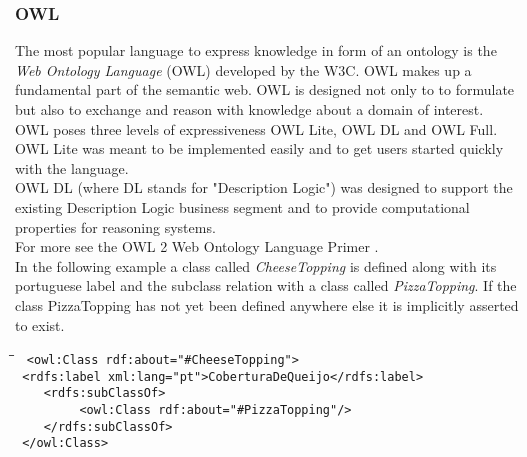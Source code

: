 \subsubsection{OWL}
The most popular language to express knowledge in form of an ontology is
the \emph{Web Ontology Language} (OWL) developed by the W3C.
OWL makes up a fundamental part of the semantic web.
OWL is designed not only to to formulate but also to exchange and reason
with knowledge about a domain of interest.\\
OWL poses three levels of expressiveness OWL Lite, OWL DL and OWL Full.
OWL Lite was meant to be implemented easily and to get users started quickly
with the language.\\
OWL DL (where DL stands for "Description Logic") was designed to support
the existing Description Logic business segment and to provide computational
properties for reasoning systems.\\
For more see the OWL 2 Web Ontology Language Primer \cite{OWL2Primer}.\\
\vspace{1cm}
In the following example a class called \emph{CheeseTopping} is defined
along with its portuguese label and the subclass relation with a class
called \emph{PizzaTopping}.
If the class PizzaTopping has not yet been defined anywhere else it is
implicitly asserted to exist.
\begin{tabbing}
\hspace*{1cm}\=\hspace{1cm}\=\hspace{1cm}\=\kill
\verb$ <owl:Class rdf:about="#CheeseTopping">$\\
\>\verb$ <rdfs:label xml:lang="pt">CoberturaDeQueijo</rdfs:label>$ \\ 
\>\verb$	<rdfs:subClassOf>$\\
\> \> \verb$		 <owl:Class rdf:about="#PizzaTopping"/>$\\
\>\verb$	</rdfs:subClassOf>$\\
\verb$ </owl:Class>$\\
\end{tabbing}

